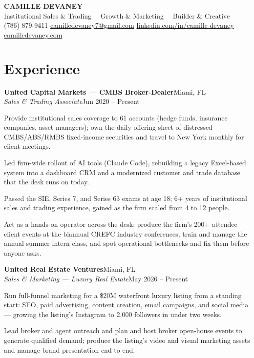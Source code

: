 \documentclass[letterpaper,10pt]{article}
\newcommand{\entry}[4]{%
  \textbf{#1}\hfill {#2}\\[1pt]
  \textit{#3}\hfill {#4}\par
}
\begin{document}
\begin{center}
  {\LARGE\bfseries CAMILLE DEVANEY}\\[3pt]
  {\small Institutional Sales \& Trading \, \textbullet\, Growth \& Marketing \, \textbullet\, Builder \& Creative}\\[5pt]
  {\small
    (786) 879-9411 \quad\textbar\quad
    \href{mailto:camilledevaney7@gmail.com}{camilledevaney7@gmail.com} \quad\textbar\quad
    \href{https://www.linkedin.com/in/camille-devaney-0b51a41a6}{linkedin.com/in/camille-devaney} \quad\textbar\quad
    \href{https://camilledevaney.com}{camilledevaney.com}
  }
\end{center}

\vspace{2pt}
\section{Experience}

\entry{United Capital Markets --- CMBS Broker-Dealer}{Miami, FL}{Sales \& Trading Associate}{Jun 2020 -- Present}
\begin{points}
  \item Provide institutional sales coverage to 61 accounts (hedge funds, insurance companies, asset managers); own the daily offering sheet of distressed CMBS/ABS/RMBS fixed-income securities and travel to New York monthly for client meetings.
  \item Led firm-wide rollout of AI tools (Claude Code), rebuilding a legacy Excel-based system into a dashboard CRM and a modernized customer and trade database that the desk runs on today.
  \item Passed the SIE, Series 7, and Series 63 exams at age 18; 6+ years of institutional sales and trading experience, gained as the firm scaled from 4 to 12 people.
  \item Act as a hands-on operator across the desk: produce the firm's 200+ attendee client events at the biannual CREFC industry conferences, train and manage the annual summer intern class, and spot operational bottlenecks and fix them before anyone asks.
\end{points}

\vspace{2pt}
\entry{United Real Estate Ventures}{Miami, FL}{Sales \& Marketing --- Luxury Real Estate}{May 2026 -- Present}
\begin{points}
  \item Run full-funnel marketing for a \$20M waterfront luxury listing from a standing start: SEO, paid advertising, content creation, email campaigns, and social media --- growing the listing's Instagram to 2,000 followers in under two weeks.
  \item Lead broker and agent outreach and plan and host broker open-house events to generate qualified demand; produce the listing's video and visual marketing assets and manage brand presentation end to end.
\end{points}
\end{document}
